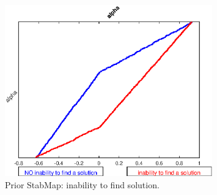 
\begin{figure}[H]
\centering 
\includegraphics[width=0.8\textwidth]{RBC_kz/gsa/RBC_kz_prior_wrong}
\caption{Prior StabMap: inability to find solution.}\label{Fig:RBC_kz_prior_wrong}
\end{figure}

